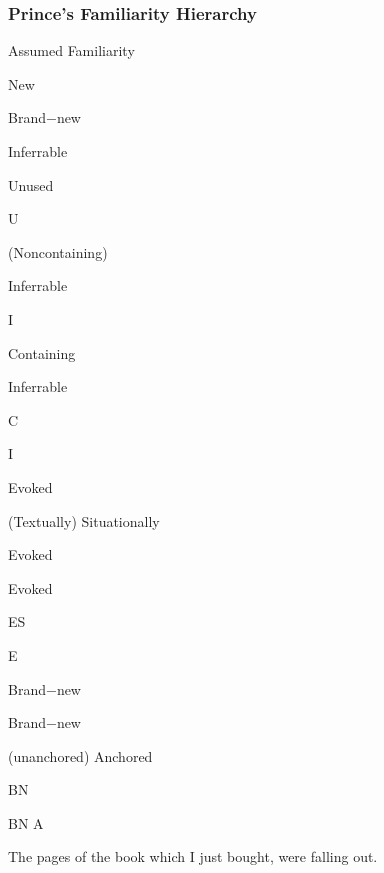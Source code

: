 \documentclass[compress,color=usenames]{beamer}
\begin{document}
\begin{frame}
\frametitle{
Prince's Familiarity Hierarchy}



Assumed Familiarity






New






Brand$-$new






Inferrable






Unused



U






(Noncontaining)



Inferrable



I






Containing



Inferrable



C



I






Evoked






(Textually) Situationally



Evoked



Evoked



ES



E






Brand$-$new



Brand$-$new



(unanchored) Anchored



BN



BN A






The pages of the book which I just bought, were falling out.










\end{frame}
\end{document}
